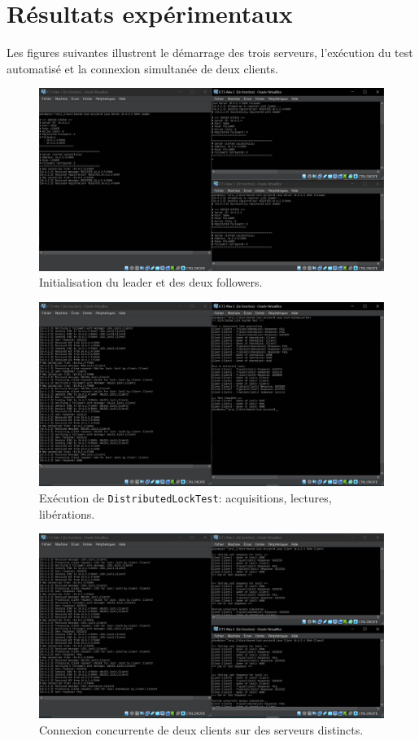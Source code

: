 \documentclass[a4paper,11pt]{article}
\begin{document}
\section{Résultats expérimentaux}
Les figures suivantes illustrent le démarrage des trois serveurs, l'exécution du test automatisé et la connexion simultanée de deux clients.

\begin{figure}[H]
\centering
\includegraphics[width=0.9\linewidth]{Capture_connection des 3 serveurs .JPG}
\caption{Initialisation du leader et des deux followers.}
\end{figure}

\begin{figure}[H]
\centering
\includegraphics[width=0.9\linewidth]{Capture_distributed_lock_test.JPG}
\caption{Exécution de \texttt{DistributedLockTest}: acquisitions, lectures, libérations.}
\end{figure}

\begin{figure}[H]
\centering
\includegraphics[width=0.9\linewidth]{Capture_ connection de deux clients .JPG}
\caption{Connexion concurrente de deux clients sur des serveurs distincts.}
\end{figure}
\end{document}
